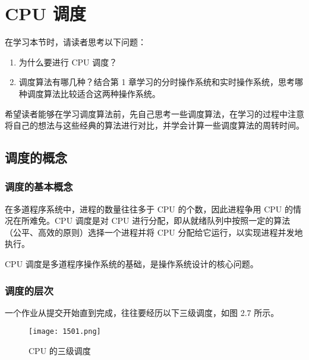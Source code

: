 \documentclass{ctexbook}
\begin{document}
	\section{CPU 调度}
	
	在学习本节时，请读者思考以下问题：
	\begin{enumerate}
		\item 为什么要进行 CPU 调度？
		\item 调度算法有哪几种？结合第 1 章学习的分时操作系统和实时操作系统，思考哪种调度算法比较适合这两种操作系统。
	\end{enumerate}
	
	希望读者能够在学习调度算法前，先自己思考一些调度算法，在学习的过程中注意将自己的想法与这些经典的算法进行对比，并学会计算一些调度算法的周转时间。
	
	\subsection{调度的概念}
	
	\subsubsection{调度的基本概念}
	
	在多道程序系统中，进程的数量往往多于 CPU 的个数，因此进程争用 CPU 的情况在所难免。CPU 调度是对 CPU 进行分配，即从就绪队列中按照一定的算法（公平、高效的原则）选择一个进程并将 CPU 分配给它运行，以实现进程并发地执行。
	
	CPU 调度是多道程序操作系统的基础，是操作系统设计的核心问题。
	
	\subsubsection{调度的层次}
	
	一个作业从提交开始直到完成，往往要经历以下三级调度，如图 2.7 所示。
	
	\begin{figure}[h]
		\centering
		\texttt{[image: 1501.png]}
		\caption{CPU 的三级调度}
		\label{fig:cpu_scheduling}
	\end{figure}
	
\end{document}
